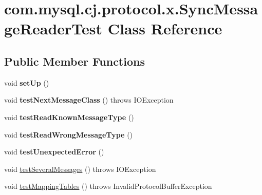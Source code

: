\hypertarget{classcom_1_1mysql_1_1cj_1_1protocol_1_1x_1_1_sync_message_reader_test}{}\section{com.\+mysql.\+cj.\+protocol.\+x.\+Sync\+Message\+Reader\+Test Class Reference}
\label{classcom_1_1mysql_1_1cj_1_1protocol_1_1x_1_1_sync_message_reader_test}
\subsection*{Public Member Functions}
\begin{DoxyCompactItemize}
\item 
\mbox{\label{classcom_1_1mysql_1_1cj_1_1protocol_1_1x_1_1_sync_message_reader_test_a38e29c46cf4e2d1df8a67c6b7a650eca}} 
void {\bfseries set\+Up} ()
\item 
\mbox{\label{classcom_1_1mysql_1_1cj_1_1protocol_1_1x_1_1_sync_message_reader_test_a1570bd2084f53957a4e5d307943fc7c9}} 
void {\bfseries test\+Next\+Message\+Class} ()  throws I\+O\+Exception 
\item 
\mbox{\label{classcom_1_1mysql_1_1cj_1_1protocol_1_1x_1_1_sync_message_reader_test_ae6eea19c7e4e2ae5fc1af86f0843012e}} 
void {\bfseries test\+Read\+Known\+Message\+Type} ()
\item 
\mbox{\label{classcom_1_1mysql_1_1cj_1_1protocol_1_1x_1_1_sync_message_reader_test_ac7f1d29ed603082d8d5ae1e1d6452b29}} 
void {\bfseries test\+Read\+Wrong\+Message\+Type} ()
\item 
\mbox{\label{classcom_1_1mysql_1_1cj_1_1protocol_1_1x_1_1_sync_message_reader_test_a17dbdcaef334349d660ff880c2de6daa}} 
void {\bfseries test\+Unexpected\+Error} ()
\item 
void \mbox{\hyperlink{classcom_1_1mysql_1_1cj_1_1protocol_1_1x_1_1_sync_message_reader_test_a22b8b0451c4dc79d8613938c60802da9}{test\+Several\+Messages}} ()  throws I\+O\+Exception 
\item 
void \mbox{\hyperlink{classcom_1_1mysql_1_1cj_1_1protocol_1_1x_1_1_sync_message_reader_test_ab063fb28df87040e23afe85d95d26971}{test\+Mapping\+Tables}} ()  throws Invalid\+Protocol\+Buffer\+Exception 
\end{DoxyCompactItemize}



